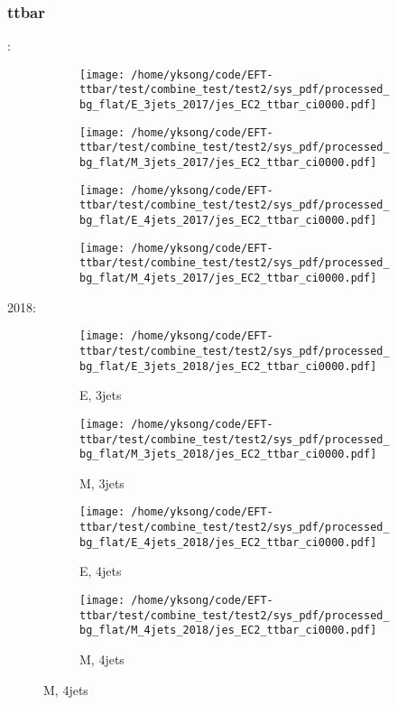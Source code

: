 \documentclass{beamer}
\begin{document}
\begin{frame}
\frametitle{ttbar}
\fontsize{5}{1}:
\begin{figure}
\centering
\begin{subfigure}[b]{0.24\textwidth}
\texttt{[image: /home/yksong/code/EFT-ttbar/test/combine\_test/test2/sys\_pdf/processed\_bg\_flat/E\_3jets\_2017/jes\_EC2\_ttbar\_ci0000.pdf]}
\end{subfigure}
\begin{subfigure}[b]{0.24\textwidth}
\texttt{[image: /home/yksong/code/EFT-ttbar/test/combine\_test/test2/sys\_pdf/processed\_bg\_flat/M\_3jets\_2017/jes\_EC2\_ttbar\_ci0000.pdf]}
\end{subfigure}
\begin{subfigure}[b]{0.24\textwidth}
\texttt{[image: /home/yksong/code/EFT-ttbar/test/combine\_test/test2/sys\_pdf/processed\_bg\_flat/E\_4jets\_2017/jes\_EC2\_ttbar\_ci0000.pdf]}
\end{subfigure}
\begin{subfigure}[b]{0.24\textwidth}
\texttt{[image: /home/yksong/code/EFT-ttbar/test/combine\_test/test2/sys\_pdf/processed\_bg\_flat/M\_4jets\_2017/jes\_EC2\_ttbar\_ci0000.pdf]}
\end{subfigure}
\end{figure}
2018:
\begin{figure}
\centering
\begin{subfigure}[b]{0.24\textwidth}
\texttt{[image: /home/yksong/code/EFT-ttbar/test/combine\_test/test2/sys\_pdf/processed\_bg\_flat/E\_3jets\_2018/jes\_EC2\_ttbar\_ci0000.pdf]}
\captionsetup{font=tiny}
\caption{E, 3jets}
\end{subfigure}
\begin{subfigure}[b]{0.24\textwidth}
\texttt{[image: /home/yksong/code/EFT-ttbar/test/combine\_test/test2/sys\_pdf/processed\_bg\_flat/M\_3jets\_2018/jes\_EC2\_ttbar\_ci0000.pdf]}
\captionsetup{font=tiny}
\caption{M, 3jets}
\end{subfigure}
\begin{subfigure}[b]{0.24\textwidth}
\texttt{[image: /home/yksong/code/EFT-ttbar/test/combine\_test/test2/sys\_pdf/processed\_bg\_flat/E\_4jets\_2018/jes\_EC2\_ttbar\_ci0000.pdf]}
\captionsetup{font=tiny}
\caption{E, 4jets}
\end{subfigure}
\begin{subfigure}[b]{0.24\textwidth}
\texttt{[image: /home/yksong/code/EFT-ttbar/test/combine\_test/test2/sys\_pdf/processed\_bg\_flat/M\_4jets\_2018/jes\_EC2\_ttbar\_ci0000.pdf]}
\captionsetup{font=tiny}
\caption{M, 4jets}
\end{subfigure}
\end{figure}
\end{frame}
\end{document}
